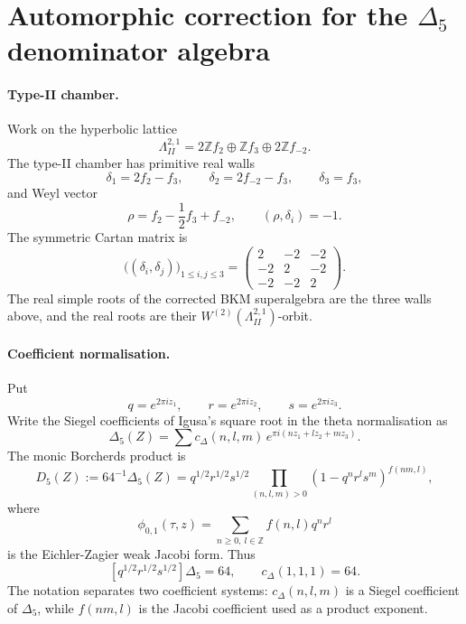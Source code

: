 
\providecommand{\Z}{\mathbb Z}
\providecommand{\N}{\mathbb N}
\providecommand{\R}{\mathbb R}
\providecommand{\LambdaIIone}{\Lambda^{2,1}_{II}}
\providecommand{\PII}{\mathcal P_{II}}
\providecommand{\WII}{W^{(2)}(\LambdaIIone)}
\providecommand{\kBKM}{\kappa_{\mathrm{BKM}}}
\providecommand{\kCH}{\kappa_{\mathrm{ch}}}
\providecommand{\kCat}{\kappa_{\mathrm{cat}}}
\providecommand{\kFiber}{\kappa_{\mathrm{fiber}}}
\providecommand{\gDeltaFive}{\mathfrak g_{\Delta_5}}
\providecommand{\wt}{\operatorname{wt}}
\providecommand{\smult}{\operatorname{smult}}

\section*{Automorphic correction for the $\Delta_5$ denominator algebra}

\paragraph{Type-II chamber.}
Work on the hyperbolic lattice
\[
  \LambdaIIone=2\Z f_2\oplus \Z f_3\oplus 2\Z f_{-2}.
\]
The type-II chamber has primitive real walls
\[
  \delta_1=2f_2-f_3,\qquad
  \delta_2=2f_{-2}-f_3,\qquad
  \delta_3=f_3,
\]
and Weyl vector
\[
  \rho=f_2-\frac12 f_3+f_{-2},
  \qquad
  (\rho,\delta_i)=-1.
\]
The symmetric Cartan matrix is
\[
  \bigl((\delta_i,\delta_j)\bigr)_{1\leq i,j\leq3}
  =
  \begin{pmatrix}
  2&-2&-2\\
  -2&2&-2\\
  -2&-2&2
  \end{pmatrix}.
\]
The real simple roots of the corrected BKM superalgebra are the three
walls above, and the real roots are their
\(\WII\)-orbit.

\paragraph{Coefficient normalisation.}
Put
\[
  q=e^{2\pi i z_1},\qquad r=e^{2\pi i z_2},\qquad
  s=e^{2\pi i z_3}.
\]
Write the Siegel coefficients of Igusa's square root in the theta
normalisation as
\[
  \Delta_5(Z)
  =\sum c_\Delta(n,l,m)\,
    e^{\pi i(nz_1+lz_2+mz_3)} .
\]
The monic Borcherds product is
\[
  D_5(Z):=64^{-1}\Delta_5(Z)
  =
  q^{1/2}r^{1/2}s^{1/2}
  \prod_{(n,l,m)>0}
  (1-q^nr^ls^m)^{f(nm,l)},
\]
where
\[
  \phi_{0,1}(\tau,z)=\sum_{n\geq0,\ l\in\Z}f(n,l)q^nr^l
\]
is the Eichler-Zagier weak Jacobi form. Thus
\[
  [q^{1/2}r^{1/2}s^{1/2}]\Delta_5=64,
  \qquad c_\Delta(1,1,1)=64.
\]
The notation separates two coefficient systems: \(c_\Delta(n,l,m)\) is
a Siegel coefficient of \(\Delta_5\), while \(f(nm,l)\) is the Jacobi
coefficient used as a product exponent.

